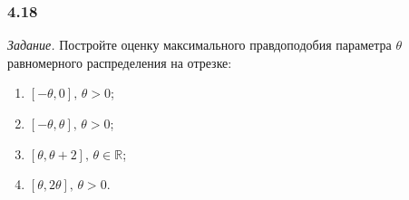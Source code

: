 \subsubsection*{4.18}

\textit{Задание.}
Постройте оценку максимального правдоподобия параметра $ \theta $
равномерного распределения на отрезке:
\begin{enumerate}[label=\alph*)]
  \item $ \left[- \theta, 0 \right], \, \theta > 0$;
  \item $ \left[- \theta, \theta \right], \, \theta > 0$;
  \item $ \left[ \theta , \theta + 2 \right], \, \theta \in \mathbb{R}$;
  \item $ \left[ \theta, 2 \theta \right], \, \theta > 0$.
\end{enumerate}


